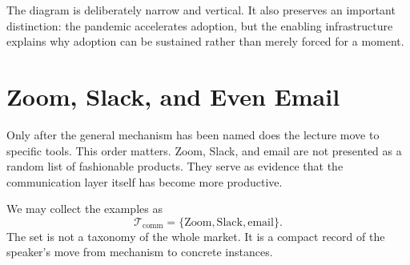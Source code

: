 \begin{figure}
\centering
{}
\end{figure}

The diagram is deliberately narrow and vertical. It also preserves an important distinction: the pandemic accelerates adoption, but the enabling infrastructure explains why adoption can be sustained rather than merely forced for a moment.

\section{Zoom, Slack, and Even Email}

Only after the general mechanism has been named does the lecture move to specific tools. This order matters. Zoom, Slack, and email are not presented as a random list of fashionable products. They serve as evidence that the communication layer itself has become more productive.

We may collect the examples as
\begin{equation}
\mathcal{T}_{\mathrm{comm}}
=
\{\mathrm{Zoom},\mathrm{Slack},\mathrm{email}\}.
\end{equation}
The set is not a taxonomy of the whole market. It is a compact record of the speaker's move from mechanism to concrete instances.

